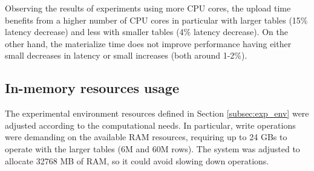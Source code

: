 Observing the results of experiments using more \gls{CPU} cores, the upload time benefits from a higher number of \gls{CPU} cores in particular with larger tables (15\% latency decrease) and less with smaller tables (4\% latency decrease). On the other hand, the materialize time does not improve performance having either small decreases in latency or small increases (both around 1-2\%).

\subsection{In-memory resources usage}
\label{subsec:resources_usage}

The experimental environment resources defined in Section \ref{subsec:exp_env} were adjusted according to the computational needs. In particular, write operations were demanding on the available \gls{RAM} resources, requiring up to 24 GBs to operate with the larger tables (6M and 60M rows). The system was adjusted to allocate 32768 MB of \gls{RAM}, so it could avoid slowing down operations.